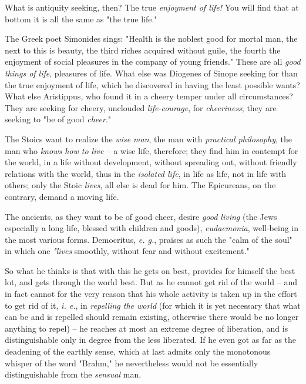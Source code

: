 What is antiquity seeking, then? The true \textit{enjoyment of life!} You will 
find that at bottom it is all the same as "{}the true life."{}

The Greek poet Simonides sings: "{}Health is the noblest good for mortal man, 
the next to this is beauty, the third riches acquired without guile, the 
fourth the enjoyment of social pleasures in the company of young friends."{} 
These are all \textit{good things of life}, pleasures of life. What else was 
Diogenes of Sinope seeking for than the true enjoyment of life, which he 
discovered in having the least possible wants? What else Aristippus, who found 
it in a cheery temper under all circumstances? They are seeking for cheery, 
unclouded \textit{life-courage}, for \textit{cheeriness}; they are seeking to 
"{}be of good \textit{cheer}."{}

The Stoics want to realize the \textit{wise man}, the man with 
\textit{practical philosophy}, the man who \textit{knows how to live --} a 
wise life, therefore; they find him in contempt for the world, in a life 
without development, without spreading out, without friendly relations with 
the world, thus in the \textit{isolated life}, in life as life, not in life 
with others; only the Stoic \textit{lives}, all else is dead for him. The 
Epicureans, on the contrary, demand a moving life.

The ancients, as they want to be of good cheer, desire \textit{good living} 
(the Jews especially a long life, blessed with children and goods), 
\textit{eudaemonia}, well-being in the most various forms. Democritus, 
\textit{e. g.}, praises as such the "{}calm of the soul"{} in which one 
\textit{"{}lives} smoothly, without fear and without excitement."{}

So what he thinks is that with this he gets on best, provides for himself the 
best lot, and gets through the world best. But as he cannot get rid of the 
world -- and in fact cannot for the very reason that his whole activity is 
taken up in the effort to get rid of it, \textit{i. e.}, in \textit{repelling 
the world} (for which it is yet necessary that what can be and is repelled 
should remain existing, otherwise there would be no longer anything to repel) 
-- he reaches at most an extreme degree of liberation, and is distinguishable 
only in degree from the less liberated. If he even got as far as the deadening 
of the earthly sense, which at last admits only the monotonous whisper of the 
word "{}Brahm,"{} he nevertheless would not be essentially distinguishable 
from the \textit{sensual} man.

